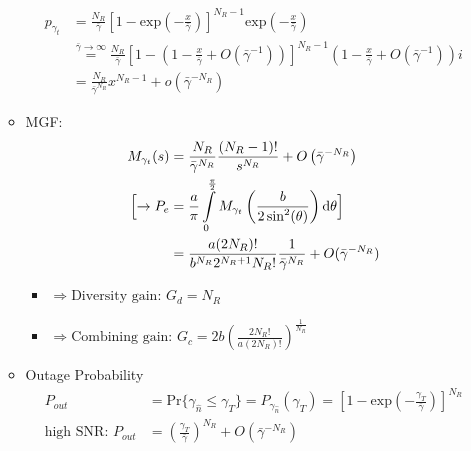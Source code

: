 \documentclass[a4paper, 10pt]{article}
\begin{document}
\begin{itemize}
\begin{itemize}
			\begin{align*}
			p_{\gamma_t}&=\frac{N_R}{\bar{\gamma}}
			\left[1-\mathrm{exp}\left(-\frac{x}{\bar{\gamma}}\right)\right]^{N_R-1}\mathrm{exp}\left(-\frac{x}{\bar{\gamma}}\right)\\
			&\overset{\bar{\gamma} \rightarrow \infty}{=} \frac{N_R}{\bar{\gamma}}
			\left[1-\left(1-\frac{x}{\bar{\gamma}}+O\left(\bar{\gamma}^{-1}\right)\right)\right]^{N_R-1}
			\left(1-\frac{x}{\bar{\gamma}}+O\left(\bar{\gamma}^{-1}\right)\right)i\\
			&=\frac{N_R}{\bar{\gamma}^{N_R}}x^{N_R-1}+o\left(\bar{\gamma}^{-N_R}\right)
			\end{align*}
		\item MGF:
			\begin{align*}
			M_{\gamma_t}(s)&=\frac{N_R}{\bar{\gamma}^{N_R}}\frac{(N_R-1)!}{s^{N_R}}+O\left(\bar{\gamma}^{-N_R}\right)\\
			\Bigl[\rightarrow P_e&=\frac{a}{\pi}\int\limits^{\frac{\pi}{2}}_0 M_{\gamma_t}\left(\frac{b}{2\sin^2(\theta)}\right)\mathrm{d}\theta\Bigr]\\
			&=\frac{a(2N_R)!}{b^{N_R}2^{N_R+1}N_R!}\frac{1}{\bar{\gamma}^{N_R}}+O(\bar{\gamma}^{-N_R})
			\end{align*}
		\begin{itemize}
			\item[] $\Longrightarrow \text{Diversity gain: } G_d = N_R$
			\item[] $\Longrightarrow \text{Combining gain: } G_c = 2b\left(\frac{2N_R!}{a(2N_R)!}\right)^{\frac{1}{N_R}}$
		\end{itemize}
		\item Outage Probability
		\begin{align*}
			P_{out}&=\mathrm{Pr}\{\gamma_{\hat{n}} \leq \gamma_T \}=P_{\gamma_{\hat{n}}}(\gamma_T)=\left[1-\mathrm{exp}\left(-\frac{\gamma_T}{\bar{\gamma}}\right)\right]^{N_R}\\
			\text{high SNR: } P_{out}&=\left(\frac{\gamma_T}{\bar{\gamma}}\right)^{N_R}+O\left(\bar{\gamma}^{-N_R}\right)
		\end{align*}
		\end{itemize}
	\end{itemize}
\end{document}
